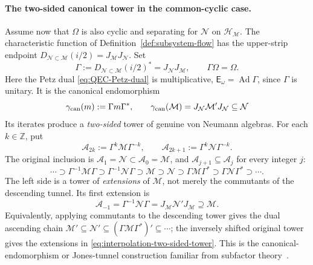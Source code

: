 \documentclass[a4paper,11pt]{article}
\theoremstyle{definition}
\newcommand{\mA}{\mathcal{A}}%
\newcommand{\mN}{\mathcal{N}}
\newcommand{\mH}{\mathcal{H}}
\newcommand{\mM}{\mathcal{M}}
\begin{document}
\paragraph{The two-sided canonical tower in the common-cyclic case.}
Assume now that $\Omega$ is also cyclic and separating for $\mN$
on $\mH_{\mM}$. The characteristic function of
Definition~\ref{def:subsystem-flow} has the upper-strip endpoint
$D_{\mN\subset\mM}(i/2)=J_{\mM}J_{\mN}$. Set
\begin{equation}
 \Gamma:=D_{\mN\subset\mM}(i/2)^*
 =J_{\mN}J_{\mM},\qquad \Gamma\Omega=\Omega.
 \label{eq:interpolation-Gamma}
\end{equation}
Here the Petz dual \eqref{eq:QEC-Petz-dual} is multiplicative,
$\mathsf E_\omega=\operatorname{Ad}\Gamma$, since $\Gamma$ is unitary.
It is the canonical endomorphism
\begin{equation}
 \gamma_{\rm can}(m):=\Gamma m\Gamma^*,\qquad
 \gamma_{\rm can}(\mM)=J_{\mN}\mM'J_{\mN}\subseteq\mN
 \label{eq:interpolation-canonical-endomorphism}
\end{equation}
Its iterates produce a \emph{two-sided} tower of genuine von Neumann algebras.
For each $k\in\mathbb Z$, put
\begin{equation}
 \mA_{2k}:=\Gamma^k\mM\Gamma^{-k},\qquad
 \mA_{2k+1}:=\Gamma^k\mN\Gamma^{-k}.
 \label{eq:interpolation-tower-levels}
\end{equation}
The original inclusion is $\mA_1=\mN\subset\mA_0=\mM$,
and $\mA_{j+1}\subseteq\mA_j$ for every integer $j$:
\begin{equation}
 \boxed{\quad
 \cdots\supset\Gamma^{-1}\mM\Gamma
 \supset\Gamma^{-1}\mN\Gamma
 \supset\mM\supset\mN
 \supset\Gamma\mM\Gamma^*\supset\Gamma\mN\Gamma^*
 \supset\cdots .\quad}
 \label{eq:interpolation-two-sided-tower}
\end{equation}
The left side is a tower of \emph{extensions} of $\mM$,
not merely the commutants of the descending tunnel. Its first extension
is
\begin{equation}
 \mA_{-1}=\Gamma^{-1}\mN\Gamma
 =J_{\mM}\mN'J_{\mM}\supseteq\mM.
 \label{eq:interpolation-first-extension}
\end{equation}
Equivalently, applying commutants to the descending tower gives the
dual ascending chain
$\mM'\subseteq\mN'\subseteq(\Gamma\mM\Gamma^*)'
\subseteq\cdots$; the inversely shifted original tower gives the
extensions in \eqref{eq:interpolation-two-sided-tower}. This is the
canonical-endomorphism or Jones-tunnel construction familiar from
subfactor theory~\cite{revolutionizing,GuidoLongoWiesbrock1998}.
\end{document}
